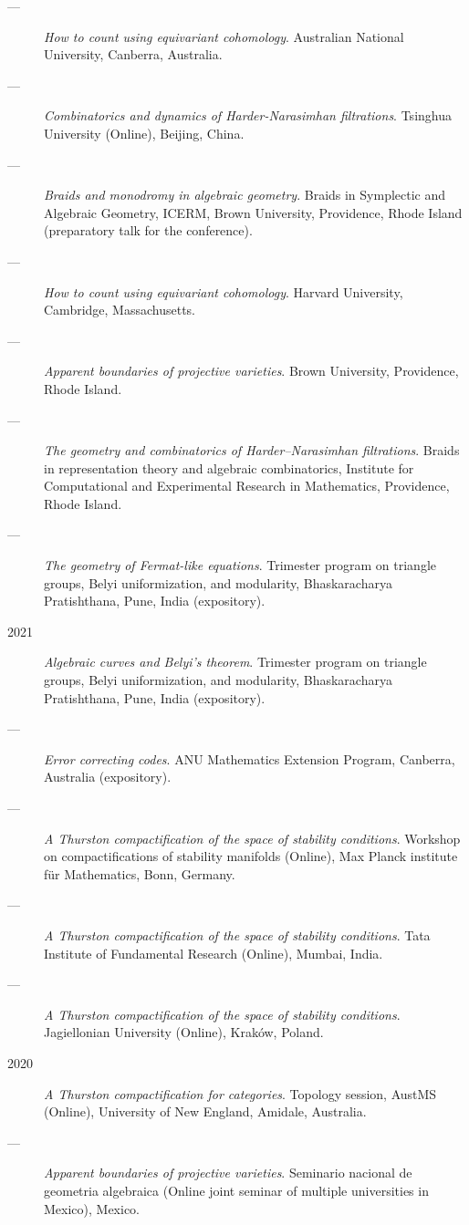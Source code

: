 \documentclass[11pt]{article}
\begin{document}
\begin{description}
\item[{---}] \emph{How to count using equivariant cohomology}. Australian National University, Canberra, Australia.
\item[{---}] \emph{Combinatorics and dynamics of Harder-Narasimhan filtrations}. Tsinghua University (Online), Beijing, China.
\item[{---}] \emph{Braids and monodromy in algebraic geometry}. Braids in Symplectic and Algebraic Geometry, ICERM, Brown University, Providence, Rhode Island (preparatory talk for the conference).
\item[{---}] \emph{How to count using equivariant cohomology}. Harvard University, Cambridge, Massachusetts.
\item[{---}] \emph{Apparent boundaries of projective varieties}. Brown University, Providence, Rhode Island.
\item[{---}] \emph{The geometry and combinatorics of Harder--Narasimhan filtrations}. Braids in representation theory and algebraic combinatorics, Institute for Computational and Experimental Research in Mathematics, Providence, Rhode Island.
\item[{---}] \emph{The geometry of Fermat-like equations}. Trimester program on triangle groups, Belyi uniformization, and modularity, Bhaskaracharya Pratishthana, Pune, India (expository).
\item[{2021}] \emph{Algebraic curves and Belyi's theorem}. Trimester program on triangle groups, Belyi uniformization, and modularity, Bhaskaracharya Pratishthana, Pune, India (expository).
\item[{---}] \emph{Error correcting codes}. ANU Mathematics Extension Program, Canberra, Australia (expository).
\item[{---}] \emph{A Thurston compactification of the space of stability conditions}. Workshop on compactifications of stability manifolds (Online), Max Planck institute für Mathematics, Bonn, Germany.
\item[{---}] \emph{A Thurston compactification of the space of stability conditions}. Tata Institute of Fundamental Research (Online), Mumbai, India.
\item[{---}] \emph{A Thurston compactification of the space of stability conditions}. Jagiellonian University (Online), Kraków, Poland.
\item[{2020}] \emph{A Thurston compactification for categories}. Topology session, AustMS (Online), University of New England, Amidale, Australia.
\item[{---}] \emph{Apparent boundaries of projective varieties}. Seminario nacional de geometria algebraica (Online joint seminar of multiple universities in Mexico), Mexico.

\end{description}
\end{document}

